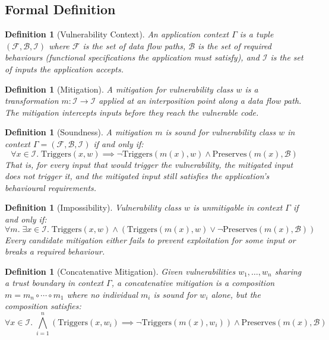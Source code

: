 \documentclass[11pt,twocolumn]{article}
\newtheorem{definition}[theorem]{Definition}
\begin{document}
\subsection{Formal Definition}

\begin{definition}[Vulnerability Context]
An \emph{application context} $\Gamma$ is a tuple
$(\mathcal{F}, \mathcal{B}, \mathcal{I})$ where $\mathcal{F}$ is
the set of data flow paths, $\mathcal{B}$ is the set of required
behaviours (functional specifications the application must satisfy),
and $\mathcal{I}$ is the set of inputs the application accepts.
\end{definition}

\begin{definition}[Mitigation]
A \emph{mitigation} for vulnerability class $w$ is a transformation
$m : \mathcal{I} \to \mathcal{I}$ applied at an interposition point
along a data flow path. The mitigation \emph{intercepts} inputs
before they reach the vulnerable code.
\end{definition}

\begin{definition}[Soundness]
A mitigation $m$ is \emph{sound} for vulnerability class $w$ in
context $\Gamma = (\mathcal{F}, \mathcal{B}, \mathcal{I})$ if and
only if:
\begin{equation}
  \forall x \in \mathcal{I}.\;
  \text{Triggers}(x, w) \implies
  \neg\text{Triggers}(m(x), w) \wedge
  \text{Preserves}(m(x), \mathcal{B})
\label{eq:soundness}
\end{equation}
That is, for every input that would trigger the vulnerability, the
mitigated input does \emph{not} trigger it, and the mitigated input
still satisfies the application's behavioural requirements.
\end{definition}

\begin{definition}[Impossibility]
Vulnerability class $w$ is \emph{unmitigable} in context $\Gamma$ if
and only if:
\begin{equation}
  \forall m.\; \exists x \in \mathcal{I}.\;
  \text{Triggers}(x, w) \wedge \left(
    \text{Triggers}(m(x), w) \vee
    \neg\text{Preserves}(m(x), \mathcal{B})
  \right)
\label{eq:impossibility}
\end{equation}
Every candidate mitigation either fails to prevent exploitation for
some input or breaks a required behaviour.
\end{definition}

\begin{definition}[Concatenative Mitigation]
Given vulnerabilities $w_1, \ldots, w_n$ sharing a trust boundary in
context $\Gamma$, a \emph{concatenative mitigation} is a composition
$m = m_n \circ \cdots \circ m_1$ where no individual $m_i$ is sound
for $w_i$ alone, but the composition satisfies:
\begin{equation}
  \forall x \in \mathcal{I}.\;
  \bigwedge_{i=1}^{n} \left(
    \text{Triggers}(x, w_i) \implies
    \neg\text{Triggers}(m(x), w_i)
  \right) \wedge
  \text{Preserves}(m(x), \mathcal{B})
\label{eq:concatenative}
\end{equation}
\end{definition}
\end{document}
